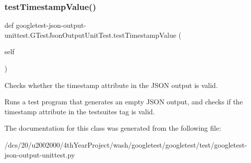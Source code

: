 \subsubsection{\texorpdfstring{test\+Timestamp\+Value()}{testTimestampValue()}}
{\footnotesize\ttfamily def googletest-\/json-\/output-\/unittest.\+G\+Test\+Json\+Output\+Unit\+Test.\+test\+Timestamp\+Value (\begin{DoxyParamCaption}\item[{}]{self }\end{DoxyParamCaption})}

\begin{DoxyVerb}Checks whether the timestamp attribute in the JSON output is valid.

Runs a test program that generates an empty JSON output, and checks if
the timestamp attribute in the testsuites tag is valid.
\end{DoxyVerb}
 

The documentation for this class was generated from the following file\+:\begin{DoxyCompactItemize}
\item 
/dcs/20/u2002000/4th\+Year\+Project/wash/googletest/googletest/test/googletest-\/json-\/output-\/unittest.\+py\end{DoxyCompactItemize}
